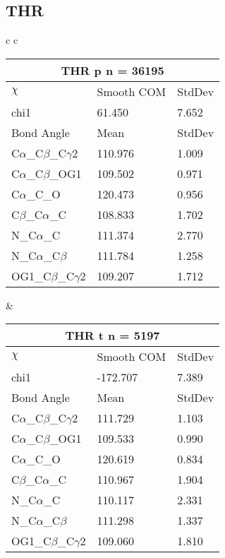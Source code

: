 \newpage
\subsection{THR}

\begin{longtable}{ c c }

  \begin{tabular}{ l l l }
  \toprule
  \multicolumn{3}{c}{THR \textbf{p} n = 36195} \\ \toprule
  $\chi$       & Smooth COM & StdDev \\ \midrule
  chi1 & 61.450 & 7.652 \\ \midrule
  Bond Angle   & Mean     & StdDev \\ \midrule
  C$\alpha$\_C$\beta$\_C$\gamma$2 & 110.976 & 1.009\\
  C$\alpha$\_C$\beta$\_OG1 & 109.502 & 0.971\\
  C$\alpha$\_C\_O & 120.473 & 0.956\\
  C$\beta$\_C$\alpha$\_C & 108.833 & 1.702\\
  N\_C$\alpha$\_C & 111.374 & 2.770\\
  N\_C$\alpha$\_C$\beta$ & 111.784 & 1.258\\
  OG1\_C$\beta$\_C$\gamma$2 & 109.207 & 1.712\\
  \bottomrule
  \end{tabular}
  &
  \begin{tabular}{ l l l }
  \toprule
  \multicolumn{3}{c}{THR \textbf{t} n = 5197} \\ \toprule
  $\chi$       & Smooth COM & StdDev \\ \midrule
  chi1 & -172.707 & 7.389 \\ \midrule
  Bond Angle   & Mean     & StdDev \\ \midrule
  C$\alpha$\_C$\beta$\_C$\gamma$2 & 111.729 & 1.103\\
  C$\alpha$\_C$\beta$\_OG1 & 109.533 & 0.990\\
  C$\alpha$\_C\_O & 120.619 & 0.834\\
  C$\beta$\_C$\alpha$\_C & 110.967 & 1.904\\
  N\_C$\alpha$\_C & 110.117 & 2.331\\
  N\_C$\alpha$\_C$\beta$ & 111.298 & 1.337\\
  OG1\_C$\beta$\_C$\gamma$2 & 109.060 & 1.810\\
  \bottomrule
  \end{tabular}
  \\
  \begin{tabular}{ l l l }

\end{tabular}
\end{longtable}

